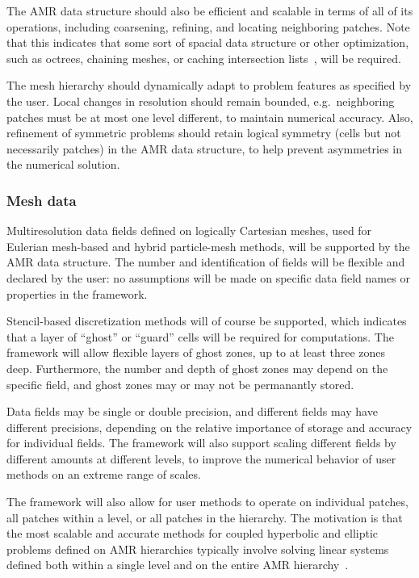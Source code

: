 \documentclass[10pt,twocolumn]{article}
\begin{document}
The AMR data structure should also be efficient and scalable in terms
of all of its operations, including coarsening, refining, and locating
neighboring patches.  Note that this indicates that some sort of
spacial data structure or other optimization, such as octrees,
chaining meshes, or caching intersection lists~\cite{StSh09}, will be
required.

The mesh hierarchy should dynamically adapt to problem features as
specified by the user.  Local changes in resolution should remain
bounded, e.g.~neighboring patches must be at most one level different,
to maintain numerical accuracy.  Also, refinement of symmetric
problems should retain logical symmetry (cells but not necessarily
patches) in the AMR data structure, to help prevent asymmetries in the
numerical solution.


\subsubsection{Mesh data} \label{sss:require-fields}

Multiresolution data fields defined on logically Cartesian meshes,
used for Eulerian mesh-based and hybrid particle-mesh methods, will be
supported by the AMR data structure.  The number and identification of
fields will be flexible and declared by the user: no assumptions will
be made on specific data field names or properties in the framework.

Stencil-based discretization methods will of course be supported,
which indicates that a layer of ``ghost'' or ``guard'' cells will be
required for computations.  The framework will allow flexible layers
of ghost zones, up to at least three zones deep.  Furthermore, the
number and depth of ghost zones may depend on the specific field, and
ghost zones may or may not be permanantly stored.

Data fields may be single or double precision, and different fields
may have different precisions, depending on the relative importance of
storage and accuracy for individual fields.  The framework will also
support scaling different fields by different amounts at different
levels, to improve the numerical behavior of user methods on an
extreme range of scales.

The framework will also allow for user methods to operate on
individual patches, all patches within a level, or all patches in the
hierarchy.  The motivation is that the most scalable and accurate
methods for coupled hyperbolic and elliptic problems defined on AMR
hierarchies typically involve solving linear systems defined both
within a single level and on the entire AMR hierarchy~\cite{MiCo07}.
\end{document}
